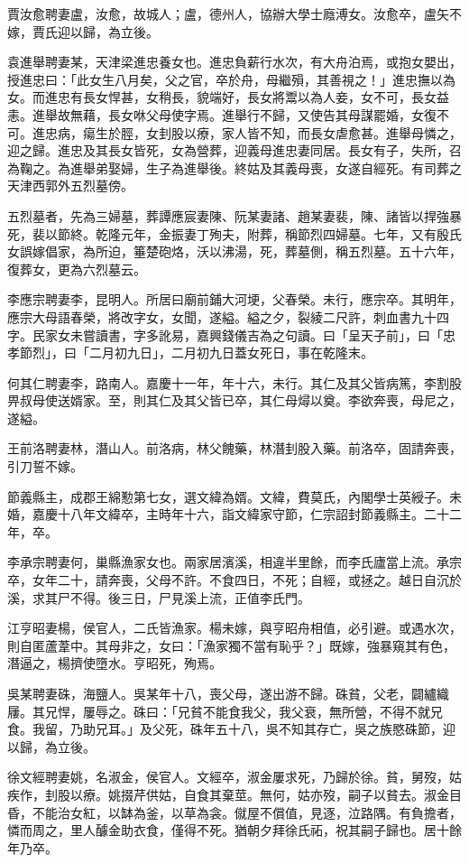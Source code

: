 \begin{pinyinscope}
賈汝愈聘妻盧，汝愈，故城人；盧，德州人，協辦大學士廕溥女。汝愈卒，盧矢不嫁，賈氏迎以歸，為立後。

袁進舉聘妻某，天津梁進忠養女也。進忠負薪行水次，有大舟泊焉，或抱女嬰出，授進忠曰：「此女生八月矣，父之官，卒於舟，母繼殞，其善視之！」進忠撫以為女。而進忠有長女悍甚，女稍長，貌端好，長女將鬻以為人妾，女不可，長女益恚。進舉故無藉，長女咻父母使字焉。進舉行不歸，又使告其母謀罷婚，女復不可。進忠病，瘍生於脛，女刲股以療，家人皆不知，而長女虐愈甚。進舉母憐之，迎之歸。進忠及其長女皆死，女為營葬，迎義母進忠妻同居。長女有子，失所，召為鞠之。為進舉弟娶婦，生子為進舉後。終姑及其義母喪，女遂自經死。有司葬之天津西郭外五烈墓傍。

五烈墓者，先為三婦墓，葬譚應宸妻陳、阮某妻諸、趙某妻裴，陳、諸皆以捍強暴死，裴以節終。乾隆元年，金振妻丁殉夫，附葬，稱節烈四婦墓。七年，又有殷氏女誤嫁倡家，為所迫，箠楚砲烙，沃以沸湯，死，葬墓側，稱五烈墓。五十六年，復葬女，更為六烈墓云。

李應宗聘妻李，昆明人。所居曰廟前鋪大河埂，父春榮。未行，應宗卒。其明年，應宗大母語春榮，將改字女，女聞，遂縊。縊之夕，裂綾二尺許，刺血書九十四字。民家女未嘗讀書，字多訛易，嘉興錢儀吉為之句讀。曰「呈天子前」，曰「忠孝節烈」，曰「二月初九日」，二月初九日蓋女死日，事在乾隆末。

何其仁聘妻李，路南人。嘉慶十一年，年十六，未行。其仁及其父皆病篤，李割股畀叔母使送婿家。至，則其仁及其父皆已卒，其仁母燖以奠。李欲奔喪，母尼之，遂縊。

王前洛聘妻林，潛山人。前洛病，林父餽藥，林潛刲股入藥。前洛卒，固請奔喪，引刀誓不嫁。

節義縣主，成郡王綿懃第七女，選文緯為婿。文緯，費莫氏，內閣學士英綬子。未婚，嘉慶十八年文緯卒，主時年十六，詣文緯家守節，仁宗詔封節義縣主。二十二年，卒。

李承宗聘妻何，巢縣漁家女也。兩家居濱溪，相違半里餘，而李氏廬當上流。承宗卒，女年二十，請奔喪，父母不許。不食四日，不死；自經，或拯之。越日自沉於溪，求其尸不得。後三日，尸見溪上流，正值李氏門。

江亨昭妻楊，侯官人，二氏皆漁家。楊未嫁，與亨昭舟相值，必引避。或遇水次，則自匿蘆葦中。其母非之，女曰：「漁家獨不當有恥乎？」既嫁，強暴窺其有色，潛逼之，楊擠使墮水。亨昭死，殉焉。

吳某聘妻硃，海鹽人。吳某年十八，喪父母，遂出游不歸。硃貧，父老，闢纑織屨。其兄悍，屢辱之。硃曰：「兄貧不能食我父，我父衰，無所營，不得不就兄食。我留，乃助兄耳。」及父死，硃年五十八，吳不知其存亡，吳之族愍硃節，迎以歸，為立後。

徐文經聘妻姚，名淑金，侯官人。文經卒，淑金屢求死，乃歸於徐。貧，舅歿，姑疾作，刲股以療。姚掇芹供姑，自食其棄莖。無何，姑亦歿，嗣子以貧去。淑金目昏，不能治女紅，以缽為釜，以草為衾。僦屋不償值，見逐，泣路隅。有負擔者，憐而周之，里人醵金助衣食，僅得不死。猶朝夕拜徐氏祏，祝其嗣子歸也。居十餘年乃卒。


\end{pinyinscope}
